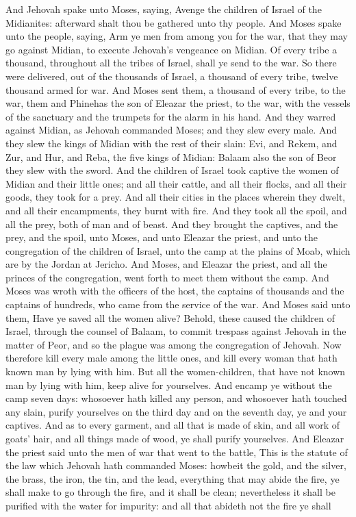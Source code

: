 And Jehovah spake unto Moses, saying, Avenge the children of Israel of the Midianites: afterward shalt thou be gathered unto thy people. And Moses spake unto the people, saying, Arm ye men from among you for the war, that they may go against Midian, to execute Jehovah’s vengeance on Midian. Of every tribe a thousand, throughout all the tribes of Israel, shall ye send to the war. So there were delivered, out of the thousands of Israel, a thousand of every tribe, twelve thousand armed for war. And Moses sent them, a thousand of every tribe, to the war, them and Phinehas the son of Eleazar the priest, to the war, with the vessels of the sanctuary and the trumpets for the alarm in his hand. And they warred against Midian, as Jehovah commanded Moses; and they slew every male. And they slew the kings of Midian with the rest of their slain: Evi, and Rekem, and Zur, and Hur, and Reba, the five kings of Midian: Balaam also the son of Beor they slew with the sword. And the children of Israel took captive the women of Midian and their little ones; and all their cattle, and all their flocks, and all their goods, they took for a prey. And all their cities in the places wherein they dwelt, and all their encampments, they burnt with fire. And they took all the spoil, and all the prey, both of man and of beast. And they brought the captives, and the prey, and the spoil, unto Moses, and unto Eleazar the priest, and unto the congregation of the children of Israel, unto the camp at the plains of Moab, which are by the Jordan at Jericho.  And Moses, and Eleazar the priest, and all the princes of the congregation, went forth to meet them without the camp. And Moses was wroth with the officers of the host, the captains of thousands and the captains of hundreds, who came from the service of the war. And Moses said unto them, Have ye saved all the women alive? Behold, these caused the children of Israel, through the counsel of Balaam, to commit trespass against Jehovah in the matter of Peor, and so the plague was among the congregation of Jehovah. Now therefore kill every male among the little ones, and kill every woman that hath known man by lying with him. But all the women-children, that have not known man by lying with him, keep alive for yourselves. And encamp ye without the camp seven days: whosoever hath killed any person, and whosoever hath touched any slain, purify yourselves on the third day and on the seventh day, ye and your captives. And as to every garment, and all that is made of skin, and all work of goats’ hair, and all things made of wood, ye shall purify yourselves.  And Eleazar the priest said unto the men of war that went to the battle, This is the statute of the law which Jehovah hath commanded Moses: howbeit the gold, and the silver, the brass, the iron, the tin, and the lead, everything that may abide the fire, ye shall make to go through the fire, and it shall be clean; nevertheless it shall be purified with the water for impurity: and all that abideth not the fire ye shall 